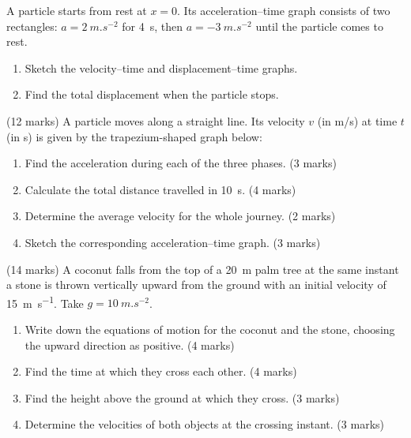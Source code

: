 \documentclass[11pt]{article}
\newcounter{popsec}
\newcounter{popsub}
\newcommand{\courssub}[1]{%
  \stepcounter{popsub}%
  \par\vspace{9pt}\noindent{\popxbold\fontsize{11.5}{13}\selectfont\color{popink}{\color{poporange}\thepopsec.\thepopsub}\hspace{6pt}#1}\par\nopagebreak\vspace{4pt}
}
\begin{document}
\begin{exercice}
A particle starts from rest at $x=0$. Its acceleration–time graph consists of two rectangles: $a = \SI{2}{m.s^{-2}}$ for \SI{4}{s}, then $a = \SI{-3}{m.s^{-2}}$ until the particle comes to rest.
\begin{enumerate}
\item Sketch the velocity–time and displacement–time graphs.
\item Find the total displacement when the particle stops.
\end{enumerate}
\end{exercice}

\courssub{I prepare for the GCE}

\begin{exercice} \hfill (12 marks)
A particle moves along a straight line. Its velocity $v$ (in m/s) at time $t$ (in s) is given by the trapezium-shaped graph below:
\begin{center}
\end{center}
\begin{enumerate}
\item Find the acceleration during each of the three phases. \hfill (3 marks)
\item Calculate the total distance travelled in \SI{10}{s}. \hfill (4 marks)
\item Determine the average velocity for the whole journey. \hfill (2 marks)
\item Sketch the corresponding acceleration–time graph. \hfill (3 marks)
\end{enumerate}
\end{exercice}

\begin{exercice} \hfill (14 marks)
A coconut falls from the top of a \SI{20}{m} palm tree at the same instant a stone is thrown vertically upward from the ground with an initial velocity of \SI{15}{m.s^{-1}}. Take $g = \SI{10}{m.s^{-2}}$.
\begin{enumerate}
\item Write down the equations of motion for the coconut and the stone, choosing the upward direction as positive. \hfill (4 marks)
\item Find the time at which they cross each other. \hfill (4 marks)
\item Find the height above the ground at which they cross. \hfill (3 marks)
\item Determine the velocities of both objects at the crossing instant. \hfill (3 marks)
\end{enumerate}
\end{exercice}
\end{document}
